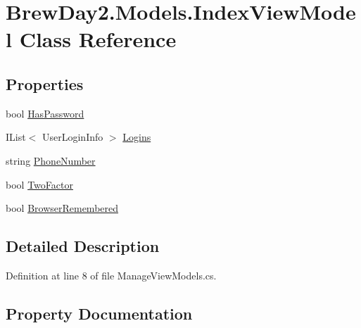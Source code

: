 \hypertarget{class_brew_day2_1_1_models_1_1_index_view_model}{}\section{Brew\+Day2.\+Models.\+Index\+View\+Model Class Reference}
\label{class_brew_day2_1_1_models_1_1_index_view_model}
\subsection*{Properties}
\begin{DoxyCompactItemize}
\item 
bool \mbox{\hyperlink{class_brew_day2_1_1_models_1_1_index_view_model_ad0a09d0180f8e081111e20ab5583a480}{Has\+Password}}
\item 
I\+List$<$ User\+Login\+Info $>$ \mbox{\hyperlink{class_brew_day2_1_1_models_1_1_index_view_model_a38984787f099f161c0fac2175046eb07}{Logins}}
\item 
string \mbox{\hyperlink{class_brew_day2_1_1_models_1_1_index_view_model_a27c4c137920b66b6c88cce97fd76e31c}{Phone\+Number}}
\item 
bool \mbox{\hyperlink{class_brew_day2_1_1_models_1_1_index_view_model_ac170a9c17343ae0585133f8727623033}{Two\+Factor}}
\item 
bool \mbox{\hyperlink{class_brew_day2_1_1_models_1_1_index_view_model_aa06da6608b419f2402b5db5711a6f468}{Browser\+Remembered}}
\end{DoxyCompactItemize}


\subsection{Detailed Description}


Definition at line 8 of file Manage\+View\+Models.\+cs.



\subsection{Property Documentation}
\mbox{\label{class_brew_day2_1_1_models_1_1_index_view_model_aa06da6608b419f2402b5db5711a6f468}} 

